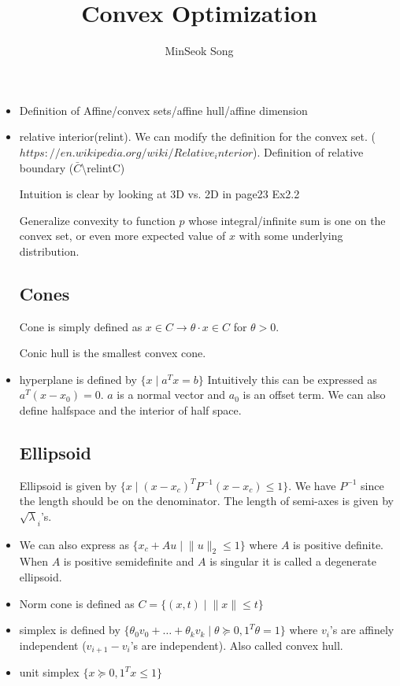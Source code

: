 \documentclass{article}
\title{Convex Optimization}
\author{MinSeok Song}
\date{}
\theoremstyle{remark}
\begin{document}
\maketitle
\begin{itemize}
\item Definition of Affine/convex sets/affine hull/affine dimension
\item relative interior(relint). We can modify the definition for the convex set. 
($https://en.wikipedia.org/wiki/Relative_interior$). Definition of relative boundary ($\bar C$\textbackslash relintC)

Intuition is clear by looking at 3D vs. 2D in page23 Ex2.2

Generalize convexity to function $p$ whose integral/infinite sum is one on the convex set, or even more expected value of $x$ with some underlying distribution.
\subsection*{Cones}
Cone is simply defined as $x\in C\to \theta\cdot x\in C$ for $\theta>0$.

Conic hull is the smallest convex cone.
\item
hyperplane is defined by $\{x\mid a^Tx=b\}$
Intuitively this can be expressed as $a^T(x-x_0)=0$.  $a$ is a normal vector and $a_0$ is an offset term. We can also define halfspace and the interior of half space.

\subsection*{Ellipsoid}Ellipsoid is given by $\{x\mid (x-x_c)^T P^{-1}(x-x_c)\leq 1\}$. We have $P^{-1}$ since the length should be on the denominator. The length of semi-axes is given by $\sqrt \lambda_i$'s.
\item We can also express as $\{x_c+Au\mid \lVert u\rVert_2\leq 1\}$ where $A$ is positive definite. When $A$ is positive semidefinite and $A$ is singular it is called a degenerate ellipsoid.
\item Norm cone is defined as $C=\{(x,t)\mid \lVert x\rVert \leq t\}$
\item simplex is defined by $\{\theta_0v_0+\dots+\theta_kv_k\mid \theta\succeq0, 1^T\theta=1\}$ where $v_i$'s are affinely independent ($v_{i+1}-v_i$'s are independent). Also called convex hull.
\item unit simplex $\{x\succeq 0, 1^Tx\leq 1\}$


\end{itemize}
\end{document}
